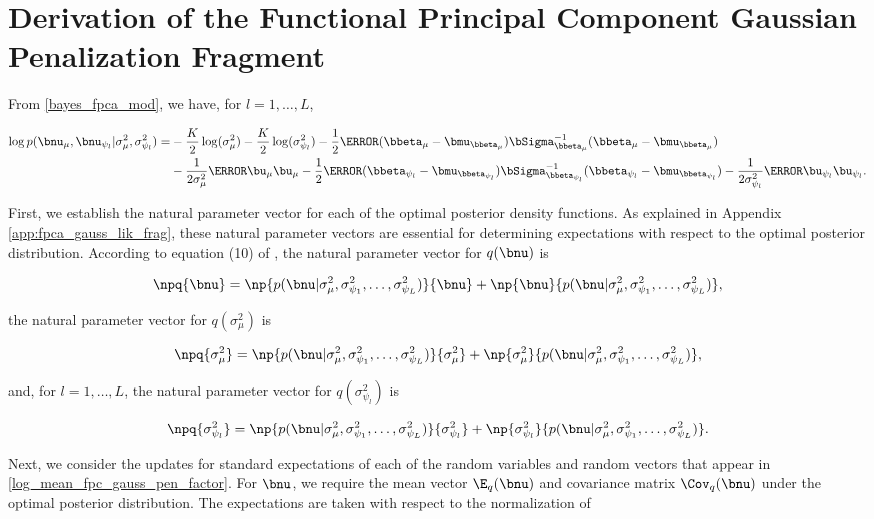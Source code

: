 \documentclass[12pt]{article}
\theoremstyle{plain}
\theoremstyle{definition}
\theoremstyle{remark}
\def\sigsqmu{\sigma^2_{\mu}}
\def\betamu{\bbeta_\mu}
\def\umu{\bu_\mu}
\def\numu{\bnu_\mu}
\newcommand\betapsi[1]{\bbeta_{\psi_{#1}}}
\newcommand\upsi[1]{\bu_{\psi_{#1}}}
\newcommand\nupsi[1]{\bnu_{\psi_{#1}}}
\newcommand\sigsqpsi[1]{\sigma^2_{\psi_{#1}}}
\begin{document}
\section{Derivation of the Functional Principal Component Gaussian Penalization Fragment}
\label{app:mean_fpc_gauss_pen_frag}

From \eqref{bayes_fpca_mod}, we have, for $l = 1, \dots, L$,

\begin{align}
\begin{split}
	\log p (\numu, \nupsi{l} | \sigsqmu, \sigsqpsi{l}) =
		& -\frac{K}{2} \log (\sigsqmu) - \frac{K}{2} \log (\sigsqpsi{l})
			- \frac12 \T{(\betamu - \bmu_{\betamu})} \bSigma_{\betamu}^{-1} (\betamu - \bmu_{\betamu}) \\
		& - \frac{1}{2 \sigsqmu} \T{\umu} \umu
			- \frac12 \T{(\betapsi{l} - \bmu_{\betapsi{l}})} \bSigma_{\betapsi{l}}^{-1} (\betapsi{l} - \bmu_{\betapsi{l}})
			- \frac{1}{2 \sigsqpsi{l}} \T{\upsi{l}} \upsi{l}.
\end{split}
\label{log_mean_fpc_gauss_pen_factor}
\end{align}

First, we establish the natural parameter vector for each of the optimal posterior density functions. As explained
in Appendix \ref{app:fpca_gauss_lik_frag}, these natural
parameter vectors are essential for determining expectations with respect to the optimal posterior distribution.
According to equation (10) of \citet{wand17}, the natural parameter vector for $q (\bnu)$ is

\[
	\npq{\bnu} =
		\np{p(\bnu | \sigsqmu, \sigsqpsi{1}, \dots, \sigsqpsi{L})}{\bnu}
		+ \np{\bnu}{p(\bnu | \sigsqmu, \sigsqpsi{1}, \dots, \sigsqpsi{L})},
\]

\noindent the natural parameter vector for $q (\sigsqmu)$ is

\[
	\npq{\sigsqmu} =
		\np{p(\bnu | \sigsqmu, \sigsqpsi{1}, \dots, \sigsqpsi{L})}{\sigsqmu}
		+ \np{\sigsqmu}{p(\bnu | \sigsqmu, \sigsqpsi{1}, \dots, \sigsqpsi{L})},
\]

\noindent and, for $l = 1, \dots, L$, the natural parameter vector for $q(\sigsqpsi{l})$ is

\[
	\npq{\sigsqpsi{l}} =
		\np{p(\bnu | \sigsqmu, \sigsqpsi{1}, \dots, \sigsqpsi{L})}{\sigsqpsi{l}}
		+ \np{\sigsqpsi{l}}{p(\bnu | \sigsqmu, \sigsqpsi{1}, \dots, \sigsqpsi{L})}.
\]

Next, we consider the updates for standard expectations of each of the random variables and random vectors
that appear in \eqref{log_mean_fpc_gauss_pen_factor}. For $\bnu$, we require the mean vector $\E_q (\bnu)$
and covariance matrix $\Cov_q (\bnu)$ under the optimal posterior distribution. The expectations are taken with
respect to the normalization of
\end{document}
